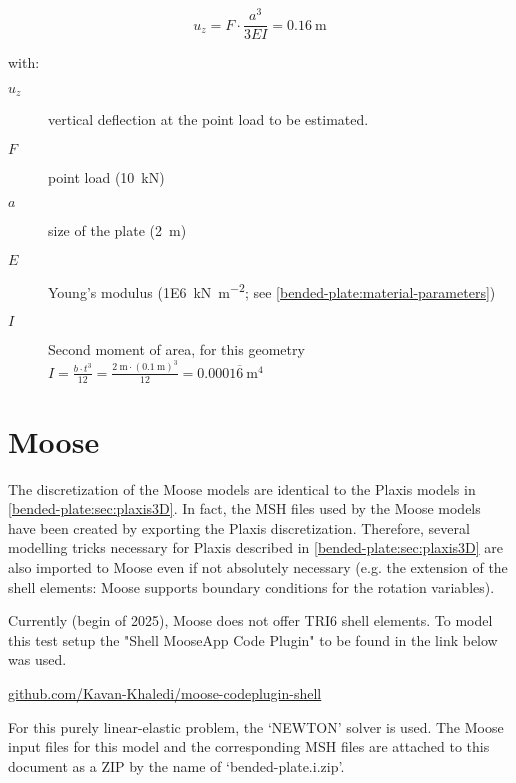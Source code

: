 \begin{equation}
    \label{bended-plate:analytical-solution}
    u_z = F \cdot \frac{a ^ 3}{3EI} = \qty{0.16}{\metre}
\end{equation}

\begin{samepage}
    with:
    \begin{description}
        \item[$u_{z}$] vertical deflection at the point load to be estimated.
        \item[$F$] point load (\qty{10}{\kilo\newton})
        \item[$a$] size of the plate (\qty{2}{\metre})
        \item[$E$] Young's modulus (\qty[per-mode = symbol]{1E6}{\kilo\newton\per\square\metre}; see \autoref{bended-plate:material-parameters})
        \item[$I$] Second moment of area, for this geometry $I = \frac{b \cdot t^3}{12} = \frac{\qty{2}{\metre} \cdot (\qty{0.1}{\metre})^3}{12} = 0.0001\overline{6} \qty{}{\metre}^4 $
    \end{description}
\end{samepage}

\section{Moose}
\label{bended-plate:sec:moose}

The discretization of the Moose models are identical to the Plaxis models in
\autoref{bended-plate:sec:plaxis3D}. In fact, the MSH files used by the Moose
models have been created by exporting the Plaxis discretization. Therefore,
several modelling tricks necessary for Plaxis described in
\autoref{bended-plate:sec:plaxis3D} are also imported to Moose even if not
absolutely necessary (e.g. the extension of the shell elements: Moose supports
boundary conditions for the rotation variables).

Currently (begin of 2025), Moose does not offer TRI6 shell elements. To model
this test setup the "Shell MooseApp Code Plugin" to be found in the link below
was used.

\href{https://github.com/Kavan-Khaledi/moose-codeplugin-shell}{github.com/Kavan-Khaledi/moose-codeplugin-shell}

For this purely linear-elastic problem, the ‘NEWTON’ solver is used. The Moose
input files for this model and the corresponding MSH files are attached to this
document as a ZIP by the name of ‘bended-plate.i.zip’.

